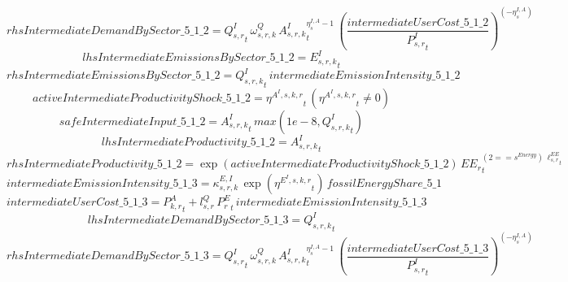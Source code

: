 \begin{dmath*}
rhsIntermediateDemandBySector\_5\_1\_2 = {{Q^{I}_{s,r}}}_{t}\, {{\omega^{Q}_{s,r,k}}}\, {{A^{I}_{s,r,k}}}_{t}^{{{\eta^{I,A}_{s}}}-1}\, \left(\frac{{intermediateUserCost\_5\_1\_2}}{{{P^{I}_{s,r}}}_{t}}\right)^{\left(-{{\eta^{I,A}_{s}}}\right)}
\end{dmath*}
\begin{dmath*}
lhsIntermediateEmissionsBySector\_5\_1\_2 = {{E^I_{s,r,k}}}_{t}
\end{dmath*}
\begin{dmath*}
rhsIntermediateEmissionsBySector\_5\_1\_2 = {{Q^{I}_{s,r,k}}}_{t}\, {intermediateEmissionIntensity\_5\_1\_2}
\end{dmath*}
\begin{dmath*}
activeIntermediateProductivityShock\_5\_1\_2 = {{\eta^{A^{I},s,k,r}}}_{t}\, \left({{\eta^{A^{I},s,k,r}}}_{t}\neq 0\right)
\end{dmath*}
\begin{dmath*}
safeIntermediateInput\_5\_1\_2 = {{A^{I}_{s,r,k}}}_{t}\, max(1e-8,{{Q^{I}_{s,r,k}}}_{t})
\end{dmath*}
\begin{dmath*}
lhsIntermediateProductivity\_5\_1\_2 = {{A^{I}_{s,r,k}}}_{t}
\end{dmath*}
\begin{dmath*}
rhsIntermediateProductivity\_5\_1\_2 = \exp\left({activeIntermediateProductivityShock\_5\_1\_2}\right)\, {{EE_r}}_{t}^{\left(2=={{s^{Energy}}}\right)\, {{\ell^{EE}_{s,r}}}_{t}}
\end{dmath*}
\begin{dmath*}
intermediateEmissionIntensity\_5\_1\_3 = {{\kappa^{E,I}_{s,r,k}}}\, \exp\left({{\eta^{E^{I},s,k,r}}}_{t}\right)\, {fossilEnergyShare\_5\_1}
\end{dmath*}
\begin{dmath*}
intermediateUserCost\_5\_1\_3 = {{P^{A}_{k,r}}}_{t}+{{l^{Q}_{s,r}}}\, {{P^E_r}}_{t}\, {intermediateEmissionIntensity\_5\_1\_3}
\end{dmath*}
\begin{dmath*}
lhsIntermediateDemandBySector\_5\_1\_3 = {{Q^{I}_{s,r,k}}}_{t}
\end{dmath*}
\begin{dmath*}
rhsIntermediateDemandBySector\_5\_1\_3 = {{Q^{I}_{s,r}}}_{t}\, {{\omega^{Q}_{s,r,k}}}\, {{A^{I}_{s,r,k}}}_{t}^{{{\eta^{I,A}_{s}}}-1}\, \left(\frac{{intermediateUserCost\_5\_1\_3}}{{{P^{I}_{s,r}}}_{t}}\right)^{\left(-{{\eta^{I,A}_{s}}}\right)}
\end{dmath*}
